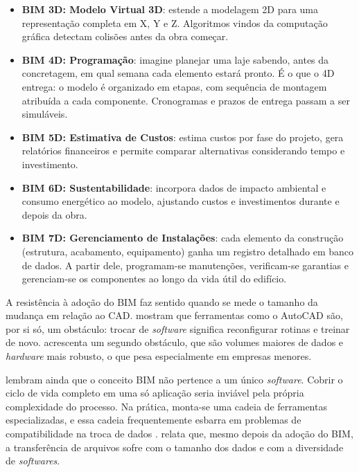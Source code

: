 \begin{itemize}

\item \textbf{BIM 3D: Modelo Virtual 3D}: estende a modelagem 2D para uma representação completa em X, Y e Z. Algoritmos vindos da computação gráfica detectam colisões antes da obra começar.

\item \textbf{BIM 4D: Programação}: imagine planejar uma laje sabendo, antes da concretagem, em qual semana cada elemento estará pronto. É o que o 4D entrega: o modelo é organizado em etapas, com sequência de montagem atribuída a cada componente. Cronogramas e prazos de entrega passam a ser simuláveis.

\item \textbf{BIM 5D: Estimativa de Custos}: estima custos por fase do projeto, gera relatórios financeiros e permite comparar alternativas considerando tempo e investimento.

\item \textbf{BIM 6D: Sustentabilidade}: incorpora dados de impacto ambiental e consumo energético ao modelo, ajustando custos e investimentos durante e depois da obra.

\item \textbf{BIM 7D: Gerenciamento de Instalações}: cada elemento da construção (estrutura, acabamento, equipamento) ganha um registro detalhado em banco de dados. A partir dele, programam-se manutenções, verificam-se garantias e gerenciam-se os componentes ao longo da vida útil do edifício.

\end{itemize}

A resistência à adoção do BIM faz sentido quando se mede o tamanho da mudança em relação ao CAD.  mostram que ferramentas como o AutoCAD são, por si só, um obstáculo: trocar de \textit{software} significa reconfigurar rotinas e treinar de novo.  acrescenta um segundo obstáculo, que são volumes maiores de dados e \textit{hardware} mais robusto, o que pesa especialmente em empresas menores.

 lembram ainda que o conceito BIM não pertence a um único \textit{software}. Cobrir o ciclo de vida completo em uma só aplicação seria inviável pela própria complexidade do processo. Na prática, monta-se uma cadeia de ferramentas especializadas, e essa cadeia frequentemente esbarra em problemas de compatibilidade na troca de dados \cite{ibrahim2004}.  relata que, mesmo depois da adoção do BIM, a transferência de arquivos sofre com o tamanho dos dados e com a diversidade de \textit{softwares}.

